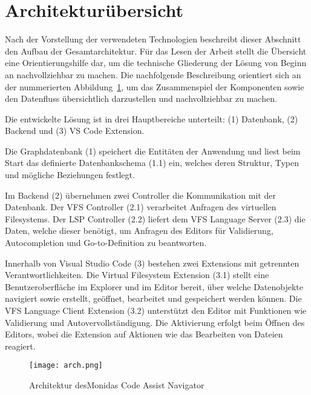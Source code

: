 \section{Architekturübersicht}
\label{kap:Architek}
Nach der Vorstellung der verwendeten Technologien beschreibt dieser Abschnitt den Aufbau der Gesamtarchitektur. Für das Lesen der Arbeit stellt die Übersicht eine Orientierungshilfe dar, um die technische Gliederung der Lösung von Beginn an nachvollziehbar zu machen. Die nachfolgende Beschreibung orientiert sich an der nummerierten Abbildung~\ref{fig:architekturuebersicht}, um das Zusammenspiel der Komponenten sowie den Datenfluss übersichtlich darzustellen und nachvollziehbar zu machen.

Die entwickelte Lösung ist in drei Hauptbereiche unterteilt: (1) Datenbank, (2) Backend und (3) VS Code Extension.

Die Graphdatenbank (1) speichert die Entitäten der Anwendung und liest beim Start das definierte Datenbankschema (1.1) ein, welches deren Struktur, Typen und mögliche Beziehungen festlegt.

Im Backend (2) übernehmen zwei Controller die Kommunikation mit der Datenbank. Der VFS Controller (2.1) verarbeitet Anfragen des virtuellen Filesystems. Der LSP Controller (2.2) liefert dem VFS Language Server (2.3) die Daten, welche dieser benötigt, um Anfragen des Editors für Validierung, Autocompletion und Go-to-Definition zu beantworten.

Innerhalb von Visual Studio Code (3) bestehen zwei Extensions mit getrennten Verantwortlichkeiten. Die Virtual Filesystem Extension (3.1) stellt eine Benutzeroberfläche im Explorer und im Editor bereit, über welche Datenobjekte navigiert sowie erstellt, geöffnet, bearbeitet und gespeichert werden können. Die VFS Language Client Extension (3.2) unterstützt den Editor mit Funktionen wie Validierung und Autovervollständigung. Die Aktivierung erfolgt beim Öffnen des Editors, wobei die Extension auf Aktionen wie das Bearbeiten von Dateien reagiert.

\begin{figure}[H]
    \centering
    \texttt{[image: arch.png]}
    \caption{Architektur desMonidas Code Assist Navigator}
    \label{fig:architekturuebersicht}
\end{figure}
